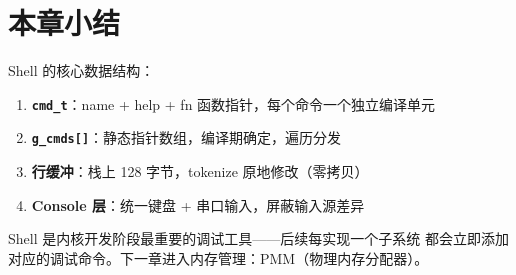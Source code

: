 \section{本章小结}

Shell 的核心数据结构：

\begin{enumerate}
  \item \textbf{\texttt{cmd\_t}}：name + help + fn 函数指针，每个命令一个独立编译单元
  \item \textbf{\texttt{g\_cmds[]}}：静态指针数组，编译期确定，遍历分发
  \item \textbf{行缓冲}：栈上 128 字节，tokenize 原地修改（零拷贝）
  \item \textbf{Console 层}：统一键盘 + 串口输入，屏蔽输入源差异
\end{enumerate}

Shell 是内核开发阶段最重要的调试工具——后续每实现一个子系统
都会立即添加对应的调试命令。下一章进入内存管理：PMM（物理内存分配器）。


